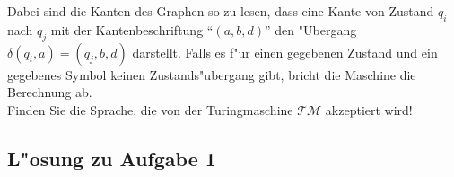 \documentclass[10pt,oneside,onecolumn,a4paper,german,titlepage]{article}
\begin{document}
\begin{enumerate}
\begin{center}
\end{center}
Dabei sind die Kanten des Graphen so zu lesen, dass eine Kante von Zustand $q_i$
nach $q_j$ mit der Kantenbeschriftung ``$(a,b,d)$'' den "Ubergang $\delta(q_i,a) =
(q_j,b,d)$ darstellt. Falls es f"ur einen gegebenen Zustand und ein gegebenes
Symbol keinen Zustands"ubergang gibt, bricht die Maschine die Berechnung ab.\\[4pt]
Finden Sie die Sprache, die von der Turingmaschine $\mathcal{TM}$ akzeptiert wird!
\end{enumerate}

\newpage

\subsection*{L"osung zu Aufgabe 1}
\end{document}
